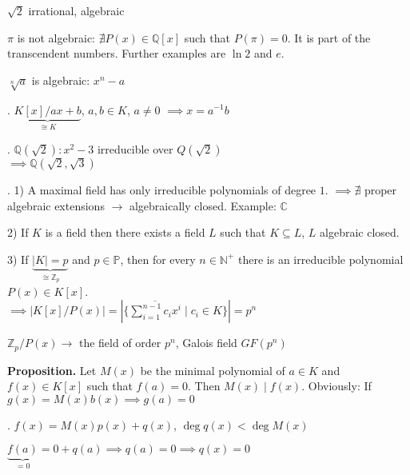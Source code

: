 $\sqrt{2}$ irrational, algebraic

$\pi$ is not algebraic: $\nexists P(x) \in \mathbb{Q}[x]$ such that $P(\pi) = 0$. It is part of the transcendent numbers. Further examples are $\ln 2$ and $e$.

$\sqrt[n]{a}$ is algebraic: $x^n-a$

\Example.
$\underbrace{K[x]/ax+b}_{\cong K}$, $a,b \in K$, $ a\neq 0$ $\implies x = a^{-1}b$

\Example.
$\mathbb{Q}(\sqrt{2}): x^2 -3$ irreducible over $Q(\sqrt{2})$\\
$\implies \mathbb{Q}(\sqrt{2}, \sqrt{3})$

\Remark.
1) A maximal field has only irreducible polynomials of degree $1$. $\implies \nexists$ proper algebraic extensions $\rightarrow$ algebraically closed. Example: $\mathbb{C}$

2) If $K$ is a field then there exists a field $L$ such that $K \subseteq L$, $L$ algebraic closed.

3) If $\underbrace{|K| = p}_{\cong \mathbb{Z}_p}$ and $p\in \mathbb{P}$, then for every $n \in \mathbb{N}^{+}$ there is an irreducible polynomial $P(x) \in K[x]$. \\
$\implies \left| K[x]/P(x) \right| = \left| \{\overline{\sum_{i=1}^{n-1} c_i x^i} \mid c_i \in K\} \right| = p^n$

$\mathbb{Z}_p/P(x) \rightarrow$ the field of order $p^n$, Galois field $GF(p^n)$

\textbf{Proposition.}
Let $M(x)$ be the minimal polynomial of $a \in K$ and $f(x) \in K[x]$ such that $f(a) = 0$. Then $M(x)∣f(x)$. Obviously: If $g(x) = M(x)b(x) \implies g(a) = 0$

\Proof.
$f(x) = M(x) p(x) + q(x)$, $\deg q(x) < \deg M(x)$

$\underbrace{f(a)}_{=0} = 0 + q(a) \implies q(a) = 0 \implies q(x) = 0$
